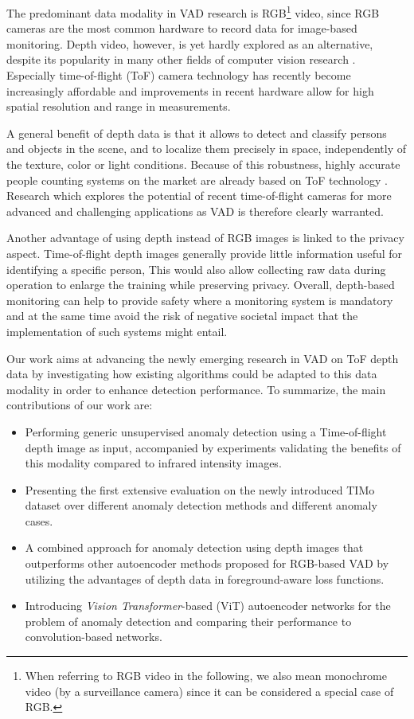 \documentclass[10pt,twocolumn,letterpaper]{article}
\begin{document}
The predominant data modality in VAD research is RGB\footnote{When referring to RGB video in the following, we also mean monochrome video (\eg by a surveillance camera) since it can be considered a special case of RGB.} video, since RGB cameras are the most common hardware to record data for image-based monitoring. Depth video, however, is yet hardly explored as an alternative, despite its popularity in many other fields of computer vision research \cite{hand_gr_depth, ppl_counting_depth}. Especially time-of-flight (ToF) camera technology has recently become increasingly affordable and improvements in recent hardware allow for high spatial resolution and range in measurements.

A general benefit of depth data is that it allows to detect and classify persons and objects in the scene, and to  localize them precisely in space, independently of the texture, color or light conditions. Because of this robustness, highly accurate people counting systems on the market are already based on ToF technology \cite{Irisys_people-counting,IEE_smartbuilding}. Research which explores the potential of recent time-of-flight cameras for more advanced and challenging applications as VAD is therefore clearly warranted.

Another advantage of using depth instead of RGB images is linked to the privacy aspect. Time-of-flight depth images generally provide little information useful for identifying a specific person,  This would also allow collecting raw data during operation to enlarge the training while preserving privacy. Overall, depth-based monitoring can help to provide safety where a monitoring system is mandatory and at the same time avoid the risk of negative societal impact that the implementation of such systems might entail.

Our work aims at advancing the newly emerging research in VAD on ToF depth data by investigating how existing algorithms could be adapted to this data modality in order to enhance detection performance. To summarize, the main contributions of our work are:
\begin{itemize}
    \item Performing generic unsupervised anomaly detection using a Time-of-flight depth image as input, accompanied by experiments validating the benefits of this modality compared to infrared intensity images.
    \item Presenting the first extensive evaluation on the newly introduced TIMo dataset \cite{schneider2021timo} over different anomaly detection methods and different anomaly cases.
    \item A combined approach for anomaly detection using depth images that outperforms other autoencoder methods proposed for RGB-based VAD by utilizing the advantages of depth data in foreground-aware loss functions.
    \item Introducing \emph{Vision Transformer}-based (ViT) autoencoder networks for the problem of anomaly detection and comparing their performance to convolution-based networks.
\end{itemize}
\end{document}
